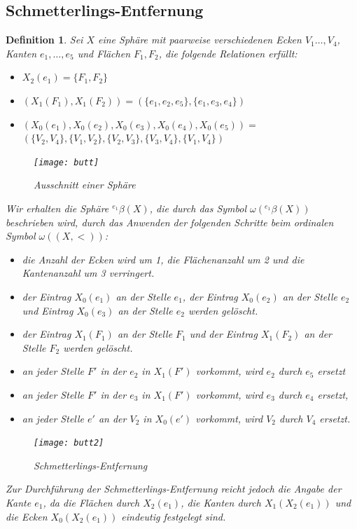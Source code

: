 \documentclass[12pt,titlepage,twoside,cleardoublepage]{article}
\theoremstyle{nummermitklammern}
\newtheorem{definition}[temp]{Definition}
\newtheorem{definition}[zahl]{Definition}
\numberwithin{equation}{section}
\begin{document}
  \subsection{Schmetterlings-Entfernung}
 \begin{definition}
 Sei $X$ eine Sphäre mit paarweise verschiedenen Ecken $V_1\ldots ,V_4$, Kanten $e_1,\ldots,e_5$ und Flächen $F_1,F_2$,
 die folgende Relationen erfüllt: 
 \begin{itemize}
 \item $X_2(e_1)=\{F_1,F_2\}$
  \item $(X_1(F_1),X_1(F_2))=(\{e_1,e_2,e_5\},\{e_1,e_3,e_4\})$
 \item   $(X_0(e_1),X_0(e_2),X_0(e_3),X_0(e_4),X_0(e_5)) =$ \\$ (\{V_2,V_4\},\{V_1,V_2\},\{V_2,V_3\},\{V_3,V_4\},\{V_1,V_4\})$
\end{itemize}  

\begin{figure}[H]
\begin{center}
\texttt{[image: butt]}
\end{center}
\caption{Ausschnitt einer Sphäre}
\end{figure}

Wir erhalten die Sphäre ${}^{e_1}\beta(X)$, die durch das Symbol $\omega({}^{e_1}\beta(X))$ beschrieben wird, durch das Anwenden der folgenden Schritte beim ordinalen Symbol $\omega((X,<))$: 
\begin{itemize}
\item die Anzahl der Ecken wird um 1, die Flächenanzahl um 2 und die Kantenanzahl um 3 verringert.
\item der Eintrag $X_0(e_1)$ an der Stelle $e_1$, der Eintrag $X_0(e_2)$ an der Stelle $e_2$ und Eintrag $X_0(e_3)$ an der Stelle $e_2$ werden gelöscht. 
\item der Eintrag $X_1(F_1)$ an der Stelle $F_1$ und der Eintrag $X_1(F_2)$ an der Stelle $F_2$ werden gelöscht. 
\
\item an jeder Stelle ${F}'$ in der $e_2$ in $X_1({F}')$ vorkommt, wird $e_2$ durch $e_5$ ersetzt
\item an jeder Stelle ${F}'$ in der $e_3$ in $X_1({F}')$ vorkommt, wird $e_3$ durch $e_4$ ersetzt,
\item an jeder Stelle ${e}'$ an der $V_2$ in $X_0({e}')$ vorkommt, wird $V_2$ durch $V_4$ ersetzt.
\end{itemize}
\begin{figure}[H]
\begin{center}
\texttt{[image: butt2]}
\end{center}
\caption{Schmetterlings-Entfernung}
\end{figure}
Zur Durchführung der Schmetterlings-Entfernung reicht jedoch die Angabe der Kante $e_1$, da die Flächen durch $X_2(e_1)$, die Kanten durch $X_1(X_2(e_1))$ und die Ecken $X_0(X_2(e_1))$ eindeutig festgelegt sind. 
 \end{definition}
\end{document}
